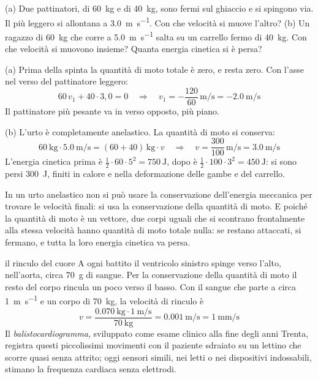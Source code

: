 \begin{esempio}
(a) Due pattinatori, di \SI{60}{\kilo\gram} e di \SI{40}{\kilo\gram}, sono fermi sul ghiaccio e si spingono via. Il più leggero si allontana a \SI{3,0}{\metre\per\second}. Con che velocità si muove l'altro? (b) Un ragazzo di \SI{60}{\kilo\gram} che corre a \SI{5,0}{\metre\per\second} salta su un carrello fermo di \SI{40}{\kilo\gram}. Con che velocità si muovono insieme? Quanta energia cinetica si è persa?

(a) Prima della spinta la quantità di moto totale è zero, e resta zero. Con l'asse nel verso del pattinatore leggero:
\[
  60\,v_1 + 40 \cdot 3{,}0 = 0 \quad\Longrightarrow\quad v_1 = -\frac{120}{60}\,\si{\metre\per\second} = \SI{-2,0}{\metre\per\second}
\]
Il pattinatore più pesante va in verso opposto, più piano.

(b) L'urto è completamente anelastico. La quantità di moto si conserva:
\[
  \SI{60}{\kilo\gram} \cdot \SI{5,0}{\metre\per\second} = (60 + 40)\,\si{\kilo\gram} \cdot v \quad\Longrightarrow\quad v = \frac{300}{100}\,\si{\metre\per\second} = \SI{3,0}{\metre\per\second}
\]
L'energia cinetica prima è $\frac12 \cdot 60 \cdot 5^2 = \SI{750}{\joule}$, dopo è $\frac12 \cdot 100 \cdot 3^2 = \SI{450}{\joule}$: si sono persi \SI{300}{\joule}, finiti in calore e nella deformazione delle gambe e del carrello.
\end{esempio}

\begin{attenzione}
In un urto anelastico non si può usare la conservazione dell'energia meccanica per trovare le velocità finali: si usa la conservazione della quantità di moto. E poiché la quantità di moto è un vettore, due corpi uguali che si scontrano frontalmente alla stessa velocità hanno quantità di moto totale nulla: se restano attaccati, si fermano, e tutta la loro energia cinetica va persa.
\end{attenzione}

\begin{applicazione}{il rinculo del cuore}
A ogni battito il ventricolo sinistro spinge verso l'alto, nell'aorta, circa \SI{70}{\gram} di sangue. Per la conservazione della quantità di moto il resto del corpo rincula un poco verso il basso. Con il sangue che parte a circa \SI{1}{\metre\per\second} e un corpo di \SI{70}{\kilo\gram}, la velocità di rinculo è
\[
  v = \frac{\SI{0,070}{\kilo\gram} \cdot \SI{1}{\metre\per\second}}{\SI{70}{\kilo\gram}} = \SI{0,001}{\metre\per\second} = \SI{1}{\milli\metre\per\second}
\]
Il \emph{balistocardiogramma}, sviluppato come esame clinico alla fine degli anni Trenta, registra questi piccolissimi movimenti con il paziente sdraiato su un lettino che scorre quasi senza attrito; oggi sensori simili, nei letti o nei dispositivi indossabili, stimano la frequenza cardiaca senza elettrodi.
\end{applicazione}

